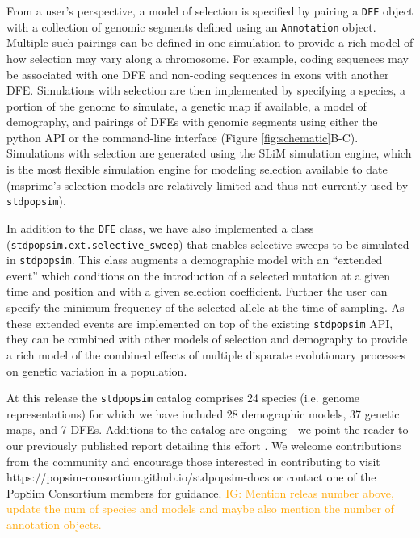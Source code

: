 \documentclass[hidelinks]{article}
\newcommand{\stdpopsim}{\texttt{stdpopsim}\xspace}
\newcommand{\igcomment}[1]{\textcolor{orange}{IG: #1}}
\begin{document}
  
    From a user's perspective, a model of selection is specified by pairing a \texttt{DFE} object
    with a collection of genomic segments defined using an \texttt{Annotation} object.
    Multiple such pairings can be defined in one simulation
    to provide a rich model of how selection may vary along a chromosome.
    For example, coding sequences may be associated with one DFE and non-coding sequences in exons with another DFE.
    Simulations with selection are then implemented by specifying a species, 
    a portion of the genome to simulate,
    a genetic map if available, a model of demography, and pairings of DFEs with genomic segments
    using either the python API or the command-line interface (Figure \ref{fig:schematic}B-C).
    Simulations with selection are generated
    using the SLiM simulation engine, which is
    the most flexible simulation engine for modeling selection available to date
    (msprime's selection models are relatively limited and thus not currently used by \stdpopsim).

    In addition to the \texttt{DFE} class, we have also implemented a class (\texttt{stdpopsim.ext.selective\_sweep})
    that enables selective sweeps to be simulated in \stdpopsim.
    This class augments a demographic model with an ``extended event''
    which conditions on the introduction of a selected mutation at a given time and position
    and with a given selection coefficient. Further the user can specify the minimum frequency
    of the selected allele at the time of sampling. As these extended events are implemented
    on top of the existing \stdpopsim API, they can be combined with other models of selection
    and demography to provide a rich model of the combined effects of multiple disparate evolutionary processes
    on genetic variation in a population.
    

    At this release the \stdpopsim catalog comprises 24 species (i.e. genome representations)
    for which we have included 28 demographic models, 37 genetic maps, and 7 DFEs. %
    Additions to the catalog are ongoing---we point the reader to our previously published 
    report detailing this effort \citep{lauterbur2023expanding}. We welcome contributions from the
    community and encourage those interested in contributing to visit https://popsim-consortium.github.io/stdpopsim-docs
    or contact one of the PopSim Consortium members for guidance.
    \igcomment{Mention releas number above, update the num of species and models and maybe also mention the number of annotation objects.}
\end{document}
